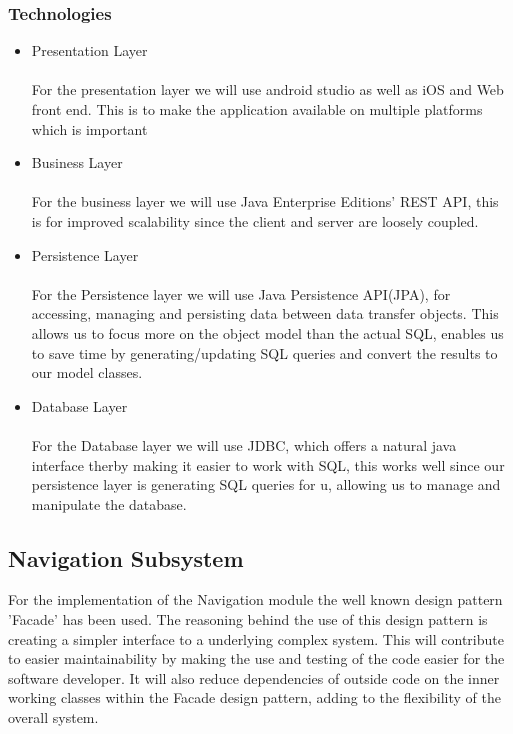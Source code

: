 \documentclass{article}
\begin{document}
	\subsubsection{Technologies}
			\begin{itemize}
 				\item Presentation Layer
				\\
				\\
				For the presentation layer we will use android studio as well as iOS and Web front end. This is to make the application available on multiple platforms which is important
 			
				
 			
				\item Business Layer
				\\
				\\
				For the business layer we will use Java Enterprise Editions' REST API, this is for improved scalability since the client and server are loosely coupled.
 				
			
				\item Persistence Layer
				\\
				\\
				For the Persistence layer we will use Java Persistence API(JPA), for accessing, managing and persisting data between data transfer objects. This allows us to focus more on the object model than the actual SQL, enables us to save time by generating/updating SQL queries and convert the results to our model classes.
	
				
				\item Database Layer
				\\
				\\
				For the Database layer we will use JDBC, which offers a natural java interface therby making it easier to work with SQL, this works well since our persistence layer is generating SQL queries for u, allowing us to manage and manipulate the database.
				
			
 		\end{itemize}
 		
 		\subsection{Navigation Subsystem}
				For the implementation of the Navigation module the well known design pattern 'Facade' has been used. The reasoning behind the use of this design pattern is creating a simpler interface to a underlying complex system. This will contribute to easier maintainability by making the use and testing of the code easier for the software developer. It will also reduce dependencies of outside code on the inner working classes within the Facade design pattern, adding to the flexibility of the overall system.
				
\end{document}
